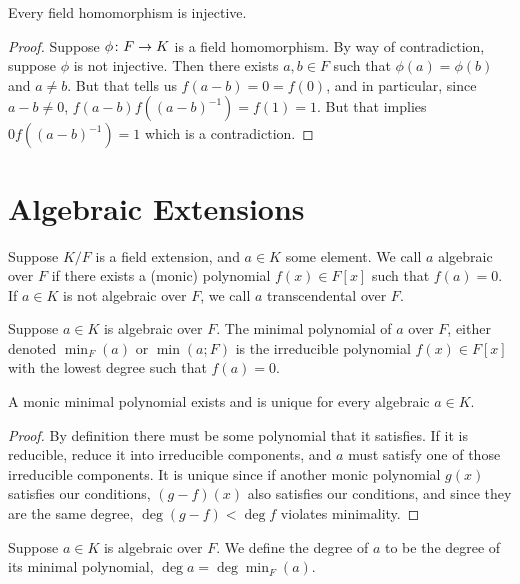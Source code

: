 \begin{theorem}\label{thm:field-hom-injective}
    Every field homomorphism is injective.
\end{theorem}
\begin{proof}
    Suppose \(\phi\colon F\to K\) is a field homomorphism.
    By way of contradiction, suppose \(\phi\) is not injective.
    Then there exists \(a,b \in F\) such that \(\phi(a) = \phi(b)\) and \(a \neq b\).
    But that tells us \(f(a-b) = 0 = f(0)\), and in particular,
    since \(a-b \neq 0\), \(f(a-b)f({(a-b)}^{-1}) = f(1) = 1\).
    But that implies \(0f({(a-b)}^{-1}) = 1\) which is a contradiction.
\end{proof}


\section{Algebraic Extensions}

\begin{definition}
    Suppose \(K/F\) is a field extension, and \(a \in K\) some element.
    We call \(a\) algebraic over \(F\)
    if there exists a (monic) polynomial \(f(x) \in F[x]\) such that \(f(a) = 0\).
    If \(a \in K\) is not algebraic over \(F\),
    we call \(a\) transcendental over \(F\).
\end{definition}

\begin{definition}
    Suppose \(a \in K\) is algebraic over \(F\).
    The minimal polynomial of \(a\) over \(F\),
    either denoted \(\min_F(a)\) or \(\min(a;F)\)
    is the irreducible polynomial \(f(x) \in F[x]\)
    with the lowest degree such that \(f(a) = 0\).
\end{definition}
\begin{proposition}
    A monic minimal polynomial exists and is unique for every algebraic \(a \in K\).
\end{proposition}
\begin{proof}
    By definition there must be some polynomial that it satisfies.
    If it is reducible, reduce it into irreducible components,
    and \(a\) must satisfy one of those irreducible components.
    It is unique since if another monic polynomial \(g(x)\) satisfies our conditions,
    \((g-f)(x)\) also satisfies our conditions,
    and since they are the same degree, \(\deg(g-f) < \deg f\) violates minimality.
\end{proof}
\begin{definition}
    Suppose \(a \in K\) is algebraic over \(F\).
    We define the degree of \(a\) to be the degree of its minimal polynomial,
    \(\deg a = \deg \min_F(a)\).
\end{definition}

